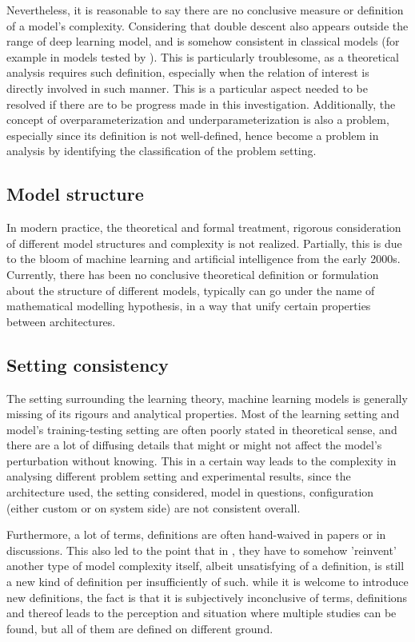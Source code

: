 \documentclass[10pt,oneside,oldfontcommands,dvipsnames,article]{memoir}
\begin{document}
Nevertheless, it is reasonable to say there are no conclusive measure or definition of a model's complexity. Considering that double descent also appears outside the range of deep learning model, and is somehow consistent in classical models (for example in models tested by \cite{belkin_reconciling_2019}). This is particularly troublesome, as a theoretical analysis requires such definition, especially when the relation of interest is directly involved in such manner. This is a particular aspect needed to be resolved if there are to be progress made in this investigation. Additionally, the concept of overparameterization and underparameterization is also a problem, especially since its definition is not well-defined, hence become a problem in analysis by identifying the classification of the problem setting. 
\subsection{Model structure}

In modern practice, the theoretical and formal treatment, rigorous consideration of different model structures and complexity is not realized. Partially, this is due to the bloom of machine learning and artificial intelligence from the early 2000s. Currently, there has been no conclusive theoretical definition or formulation about the structure of different models, typically can go under the name of mathematical modelling hypothesis, in a way that unify certain properties between architectures. 

\subsection{Setting consistency}

The setting surrounding the learning theory, machine learning models is generally missing of its rigours and analytical properties. Most of the learning setting and model's training-testing setting are often poorly stated in theoretical sense, and there are a lot of diffusing details that might or might not affect the model's perturbation without knowing. This in a certain way leads to the complexity in analysing different problem setting and experimental results, since the architecture used, the setting considered, model in questions, configuration (either custom or on system side) are not consistent overall. 

Furthermore, a lot of terms, definitions are often hand-waived in papers or in discussions. This also led to the point that in \cite{nakkiran_deep_2019}, they have to somehow 'reinvent' another type of model complexity itself, albeit unsatisfying of a definition, is still a new kind of definition per insufficiently of such. while it is welcome to introduce new definitions, the fact is that it is subjectively inconclusive of terms, definitions and thereof leads to the perception and situation where multiple studies can be found, but all of them are defined on different ground.
\end{document}
